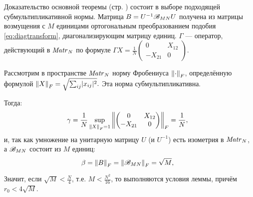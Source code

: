 Доказательство основной теоремы (стр. \pageref{thm:almostallones-spectra})
состоит в выборе подходящей субмультипликативной нормы.
Матрица \( B = U^{-1} \perturbmatrix{M}{N} U \)
получена из матрицы возмущения с \( M \) единицами
ортогональным преобразованием подобия \eqref{eq:diagtransform},
диагонализирующим матрицу единиц.
\( \Gamma \) --- оператор, действующий в \( \matr{N}{} \)
по формуле
\( { \Gamma X = \frac1N \begin{pmatrix}0 & X_{12} \\ -X_{21} & 0\end{pmatrix} } \).

Рассмотрим в пространстве \( \matr{N}{} \)
норму Фробениуса \( \normex{F}{\cdot} \),
определённую формулой
\( \normex{F}{X} = \sqrt{\sum_{ij} \lvert x_{ij}\rvert^2}. \)
Эта норма субмультипликативна.

Тогда:
\[ \gamma = \frac1N
            \sup_{\normex{F}{X}=1}\normex{F}{\begin{pmatrix}0 & X_{12} \\ -X_{21} & 0\end{pmatrix}}
          = \frac1N,
    \]
и, так как умножение на унитарную матрицу \( U \)
    (и \( U^{-1} \)) есть изометрия в \( \matr{N}{} \),
    а \( \perturbmatrix{M}{N} \) состоит из \( M \) единиц:
\[
    \beta = \normex{F}{B} =
    \normex{F}{\perturbmatrix{M}{N}} = \sqrt{M},
    \]

Значит, если
\( \sqrt{M} < \frac{N}{4} \), т.е.
\( M < \frac{N^2}{16} \),
то выполняются условия леммы,
причём \( r_0 < 4\sqrt{M} \).

